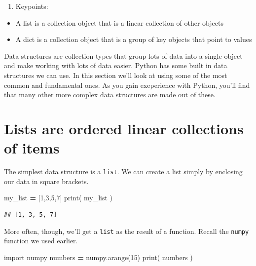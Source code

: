 \documentclass[]{book}
\newenvironment{Shaded}{\begin{snugshade}}{\end{snugshade}}
\newcommand{\BuiltInTok}[1]{#1}
\newcommand{\DecValTok}[1]{\textcolor[rgb]{0.00,0.00,0.81}{#1}}
\newcommand{\ImportTok}[1]{#1}
\newcommand{\NormalTok}[1]{#1}
\newcommand{\OperatorTok}[1]{\textcolor[rgb]{0.81,0.36,0.00}{\textbf{#1}}}
\providecommand{\tightlist}{%
  \setlength{\itemsep}{0pt}\setlength{\parskip}{0pt}}
\theoremstyle{definition}
\theoremstyle{definition}
\theoremstyle{definition}
\theoremstyle{remark}
\begin{document}
\begin{enumerate}
\def\labelenumi{\arabic{enumi}.}
\setcounter{enumi}{2}
\tightlist
\item
  Keypoints:
\end{enumerate}

\begin{itemize}
\tightlist
\item
  A list is a collection object that is a linear collection of other
  objects
\item
  A dict is a collection object that is a group of key objects that
  point to values
\end{itemize}

Data structures are collection types that group lots of data into a
single object and make working with lots of data easier. Python has some
built in data structures we can use. In this section we'll look at using
some of the most common and fundamental ones. As you gain exeperience
with Python, you'll find that many other more complex data structures
are made out of these.

\hypertarget{lists-are-ordered-linear-collections-of-items}{%
\section{Lists are ordered linear collections of
items}\label{lists-are-ordered-linear-collections-of-items}}

The simplest data structure is a \texttt{list}. We can create a list
simply by enclosing our data in square brackets.

\begin{Shaded}
\begin{Highlighting}[]
\NormalTok{my_list }\OperatorTok{=}\NormalTok{ [}\DecValTok{1}\NormalTok{,}\DecValTok{3}\NormalTok{,}\DecValTok{5}\NormalTok{,}\DecValTok{7}\NormalTok{]}
\BuiltInTok{print}\NormalTok{( my_list )}
\end{Highlighting}
\end{Shaded}

\begin{verbatim}
## [1, 3, 5, 7]
\end{verbatim}

More often, though, we'll get a \texttt{list} as the result of a
function. Recall the \texttt{numpy} function we used earlier.

\begin{Shaded}
\begin{Highlighting}[]
\ImportTok{import}\NormalTok{ numpy}
\NormalTok{numbers }\OperatorTok{=}\NormalTok{ numpy.arange(}\DecValTok{15}\NormalTok{)}
\BuiltInTok{print}\NormalTok{( numbers )}
\end{Highlighting}
\end{Shaded}
\end{document}
